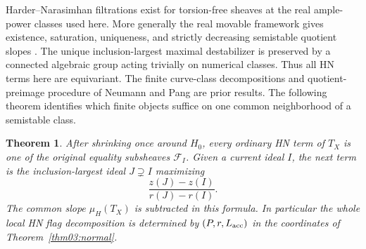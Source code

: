 \documentclass[11pt]{amsart}
\newtheorem{theorem}{Theorem}[section]
\theoremstyle{definition}
\theoremstyle{remark}
\begin{document}
Harder--Narasimhan filtrations exist for torsion-free sheaves at the
real ample-power classes used here. More generally the real movable
framework gives existence, saturation, uniqueness, and strictly
decreasing semistable quotient slopes
\cite[Theorem~1.3.20 and Remarks~1.3.22--1.3.26]{pang2015}.
The unique inclusion-largest maximal destabilizer is preserved by a
connected algebraic group acting trivially on numerical classes.
Thus all HN terms here are equivariant. The finite curve-class
decompositions and quotient-preimage procedure of Neumann and Pang
\cite[Theorem~3.3.4 and Proposition~3.3.5]{neumann2009}
\cite[Proposition~2.1.19 and \S2.2]{pang2015} are prior results.
The following theorem identifies which finite objects suffice on
one common neighborhood of a semistable class.

\begin{theorem}\label{thm08:hn}
After shrinking once around \(H_0\), every ordinary HN term of
\(T_X\) is one of the original equality subsheaves \(\mathcal F_I\).
Given a current ideal \(I\), the next term is the inclusion-largest
ideal \(J\supsetneq I\) maximizing
\begin{equation}\label{eq08:greedy}
 \frac{z(J)-z(I)}{r(J)-r(I)}.
\end{equation}
The common slope \(\mu_H(T_X)\) is subtracted in this formula.
In particular the whole local HN flag decomposition is determined by
\((P,r,L_{\rm acc})\) in the coordinates of
Theorem~\ref{thm03:normal}.
\end{theorem}
\end{document}
